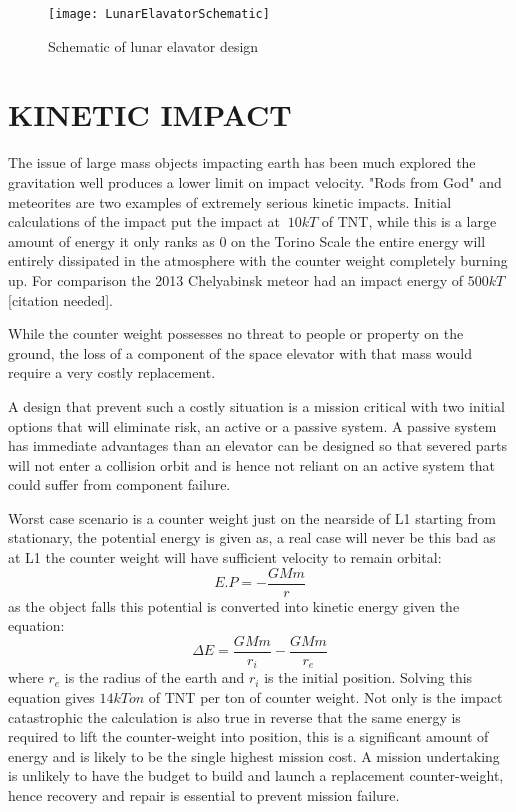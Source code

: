 \documentclass[twocolumn,prl,nobalancelastpage,aps,10pt]{revtex4-1}
\begin{document}
\begin{figure}
\texttt{[image: LunarElavatorSchematic]}
\caption{Schematic of lunar elavator design} \label{LunarElavatorSchematic}
\end{figure}

\section{KINETIC IMPACT}
The issue of large mass objects impacting earth has been much explored the gravitation well produces a lower limit on impact velocity. "Rods from God" and meteorites are two examples of extremely serious kinetic impacts. Initial calculations of the impact put the impact at $~ 10 kT$ of TNT, while this is a large amount of energy it only ranks as 0 on the Torino Scale the entire energy will entirely dissipated in the atmosphere with the counter weight completely burning up. For comparison  the 2013 Chelyabinsk meteor had an impact energy of $500kT$ [citation needed].

While the counter weight possesses no threat to people or property on the ground, the loss of a component of the space elevator with that mass would require a very costly replacement.

A design that prevent such a costly situation is a mission critical with two initial options that will eliminate risk, an active or a passive system. A passive system has immediate advantages than an elevator can be designed so that severed parts will not enter a collision orbit and is hence not reliant on an active system that could suffer from component failure.

Worst case scenario is a counter weight just on the nearside of L1 starting from stationary, the potential energy is given as, a real case will never be this bad as at L1 the counter weight will have sufficient velocity to remain orbital:
\begin{equation}
E.P = - \frac{GMm}{r}
\end{equation}
as the object falls this potential is converted into kinetic energy given the equation:
\begin{equation}
\Delta E = \frac{GMm}{r_i} - \frac{GMm}{r_e}
\end{equation}
where $r_e$ is the radius of the earth and $r_i$ is the initial position. Solving this equation gives $14 kTon$ of TNT per ton of counter weight. Not only is the impact catastrophic the calculation is also true in reverse that the same energy is required to lift the counter-weight into position, this is a significant amount of energy and is likely to be the single highest mission cost. A mission undertaking is unlikely to have the budget to build and launch a replacement counter-weight, hence recovery and repair is essential to prevent mission failure.
\end{document}
